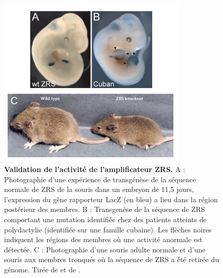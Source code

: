 \begin{figure}[h]
    \centering
    \includegraphics[width=0.8\textwidth, page=1] {figures/introduction/fig11.png}
    \caption[Validation de l'activité de l'\gls{amplificateur} \acrshort{ZRS}.]{
    \textbf{Validation de l'activité de l'\gls{amplificateur} \acrshort{ZRS}.}
    A : Photographie d'une expérience de transgénèse de la séquence normale de \acrshort{ZRS} de la souris dans un embryon de 11,5 jours, l'expression du gène rapporteur LacZ (en bleu) a lieu dans la région postérieur des membres. B : Transgenèse de la séquence de \acrshort{ZRS} comportant une mutation identifiée chez des patients atteints de polydactylie (identifiée sur une famille cubaine). Les flèches noires indiquent les régions des membres où une activité anormale est détectée. C : Photographie d'une souris adulte normale et d'une souris aux membres tronqués où la séquence de \acrshort{ZRS} a été retirée du génome.
    Tirée de \citep{lettice_long-range_2003} et de \citep{sagai_elimination_2005}.\\
    }
    \label{fig:Fig11}
\end{figure}

